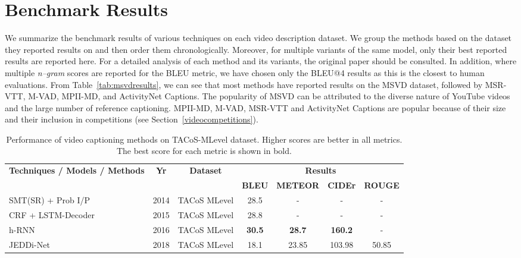 \documentclass[10pt,journal,compsoc]{IEEEtran}
\begin{document}
\section{Benchmark Results}
\label{ch:results}
We summarize the benchmark results of various techniques on each video description dataset. We group the methods based on the dataset they reported results on and then order them chronologically. Moreover, for multiple variants of the same model, only their best reported results are reported here. For a detailed analysis of each method and its variants, the original paper should be consulted. In addition, where multiple \textit{n--gram} scores are reported for the BLEU metric, we have chosen only the BLEU@4 results as this is the closest to human evaluations. From Table~\ref{tab:msvdresults}, we can see that most methods have reported results on the MSVD dataset, followed by MSR-VTT, M-VAD, MPII-MD, and ActivityNet Captions. The popularity of MSVD can be attributed to the diverse nature of YouTube videos and the large number of reference captioning. MPII-MD, M-VAD, MSR-VTT and ActivityNet Captions are popular because of their size and their inclusion in competitions (see Section~\ref{videocompetitions}).

\begin{table*}[htbp]
  \centering
  \small
  \setlength{\tabcolsep}{10.0pt}       %

\caption{Performance of video captioning methods on TACoS-MLevel dataset. Higher scores are better in all metrics. The best score for each metric is shown in bold.}
\vspace{-2mm}
     \begin{tabular}{|p{15.43em}|c|c|c|c|c|c|}
    \hline
    \multirow{2}[1]{*}{\textbf{Techniques / Models / Methods}} & \multirow{2}[1]{*}{\textbf{Yr}} & \multirow{2}[1]{*}{\textbf{Dataset}} & \multicolumn{4}{c|}{\textbf{Results}} \\
\cline{4-7}    \multicolumn{1}{|l|}{} & & & \textbf{BLEU} & \textbf{METEOR} & \textbf{CIDEr} & \textbf{ROUGE} \\
    \hline
    SMT(SR) + Prob I/P \cite{rohrbach2014coherent} & 2014  & TACoS MLevel & 28.5  & -     & -     & - \\
    \hline
    \multicolumn{1}{|l|}{CRF + LSTM-Decoder \cite{donahue2015long}}  & 2015  & {TACoS MLevel} & 28.8  & -     & -     & - \\
    \hline
    \multicolumn{1}{|l|}{h-RNN \cite{yu2016video}}  & 2016  & TACoS MLevel & \textbf{30.5}  & \textbf{28.7}  & \textbf{160.2}  & - \\
    \hline
    \multicolumn{1}{|l|}{JEDDi-Net \cite{xu2018joint}} & 2018 & TACoS MLevel & 18.1 & 23.85 & 103.98 & 50.85 \\
    \hline
    \end{tabular}%
  \label{tab:tacosmlevelresults}%
 \end{table*}%
\end{document}
